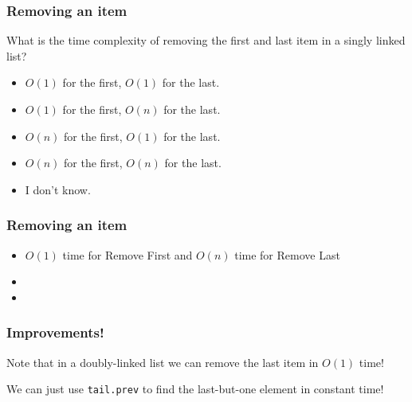 \begin{frame}
	\frametitle{Removing an item}

		What is the time complexity of removing the first and last item in a singly linked list?

		\begin{itemize}
			\item $O(1)$ for the first, $O(1)$ for the last.
			\item $O(1)$ for the first, $O(n)$ for the last.
			\item $O(n)$ for the first, $O(1)$ for the last.
			\item $O(n)$ for the first, $O(n)$ for the last.
			\item I don't know.
		\end{itemize}


\end{frame}

\begin{frame}
	\frametitle{Removing an item}


		\begin{itemize}
			\item $O(1)$ time for Remove First and $O(n)$ time for Remove Last

			\item 


		
			\item 
		


		\end{itemize}

\end{frame}

\begin{frame}
	\frametitle{Improvements!}
	
			Note that in a doubly-linked list we can remove the last item in $O(1)$ time!
			
			We can just use \texttt{tail.prev} to find the last-but-one element in constant time!
			
\end{frame}

